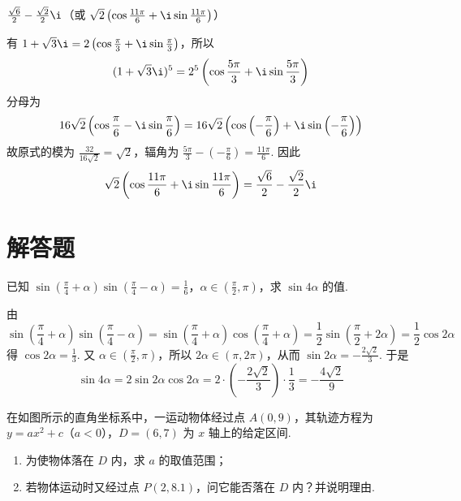 \documentclass[UTF8,a4paper,oneside,11pt]{ctexbook}
\begin{document}
\begin{answer}
\(\frac{\sqrt{6}}{2}-\frac{\sqrt{2}}{2}\i\)（或 \(\sqrt{2}\left(\cos \frac{11\pi}{6}+\i\sin \frac{11\pi}{6}\right)\)）
\end{answer}

\begin{solution}
有 \(1+\sqrt3\i=2\left(\cos\frac{\pi}{3}+\i\sin\frac{\pi}{3}\right)\)，所以
\[
(1+\sqrt3\i)^5=2^5\left(\cos\frac{5\pi}{3}+\i\sin\frac{5\pi}{3}\right)
\]
分母为
\[
16\sqrt2\left(\cos\frac{\pi}{6}-\i\sin\frac{\pi}{6}\right)
=16\sqrt2\left(\cos\left(-\frac\pi6\right)+\i\sin\left(-\frac\pi6\right)\right)
\]
故原式的模为 \(\frac{32}{16\sqrt2}=\sqrt2\)，辐角为 \(\frac{5\pi}{3}-\left(-\frac\pi6\right)=\frac{11\pi}{6}\). 因此
\[
\sqrt2\left(\cos\frac{11\pi}{6}+\i\sin\frac{11\pi}{6}\right)=\frac{\sqrt6}{2}-\frac{\sqrt2}{2}\i
\]
\end{solution}

\section{解答题}

\begin{problem}
已知 \(\sin\left(\frac{\pi}{4}+\alpha\right)\sin\left(\frac{\pi}{4}-\alpha\right)=\frac{1}{6}\)，\(\alpha\in\left(\frac{\pi}{2},\pi\right)\)，求 \(\sin 4\alpha\) 的值.
\end{problem}

\begin{solution}
由
\[
\sin\left(\frac{\pi}{4}+\alpha\right)\sin\left(\frac{\pi}{4}-\alpha\right)
=\sin\left(\frac{\pi}{4}+\alpha\right)\cos\left(\frac{\pi}{4}+\alpha\right)
=\frac{1}{2}\sin\left(\frac{\pi}{2}+2\alpha\right)
=\frac{1}{2}\cos2\alpha
\]
得 \(\cos2\alpha=\frac{1}{3}\). 又 \(\alpha\in\left(\frac{\pi}{2},\pi\right)\)，所以 \(2\alpha\in(\pi,2\pi)\)，从而
\(\sin2\alpha=-\frac{2\sqrt{2}}{3}\).
于是
\[
\sin4\alpha=2\sin2\alpha\cos2\alpha
=2\cdot\left(-\frac{2\sqrt{2}}{3}\right)\cdot\frac{1}{3}
=-\frac{4\sqrt{2}}{9}
\]
\end{solution}

\begin{problem}
在如图所示的直角坐标系中，一运动物体经过点 \(A(0,9)\)，其轨迹方程为 \(y=ax^{2}+c\)（\(a<0\)），\(D=(6,7)\) 为 \(x\) 轴上的给定区间.

\begin{enumerate}
\item 为使物体落在 \(D\) 内，求 \(a\) 的取值范围；
\item 若物体运动时又经过点 \(P(2,8.1)\)，问它能否落在 \(D\) 内？并说明理由.
\end{enumerate}

\end{problem}
\end{document}
